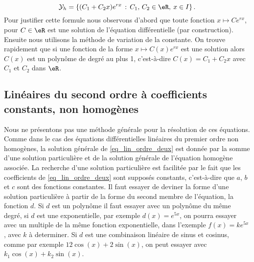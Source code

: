\begin{description}
\begin{equation}
		      \mathcal{Y}_h  = \left\{(C_1  +C_2x) e^{r x} \,:\, C_1,\, C_2 \in \eR, \: x\in I\right\}.
	      \end{equation}
	      Pour justifier cette formule nous observons d'abord que toute fonction \( x\mapsto Ce^{rx}\), pour \( C\in\eR\) est une solution de l'équation différentielle (par construction). Ensuite nous utilisons la méthode de variation de la constante. On trouve rapidement que si une fonction de la forme \( x\mapsto C(x)e^{rx}\) est une solution alors \( C(x)\) est un polynôme de degré au plus 1, c'est-à-dire \( C(x) = C_1 + C_2 x\) avec \( C_1\) et \( C_2\) dans \( \eR\).
\end{description}

\subsection{Linéaires du second ordre à coefficients constants, non homogènes}

Nous ne présentons pas une méthode générale pour la résolution de ces équations. Comme dans le cas des équations différentielles linéaires du premier ordre non homogènes, la solution générale de \eqref{eq_lin_ordre_deux} est donnée par la somme d'une solution particulière et de la solution générale de l'équation homogène associée. La recherche d'une solution particulière est facilitée par le fait que les coefficients de \eqref{eq_lin_ordre_deux} sont supposés constants, c'est-à-dire que \( a\), \( b\) et \( c\) sont des fonctions constantes. Il faut essayer de deviner la forme d'une solution particulière à partir de la forme du second membre de l'équation, la fonction \( d\). Si \( d\) est un polynôme il faut essayer avec un polynôme du même degré, si \( d\) est une exponentielle, par exemple \( d(x) = e^{5x}\), on pourra essayer avec un multiple de la m\^eme fonction exponentielle, dans l'exemple \( f(x) = k e^{5x}\), avec \( k\) à determiner. Si \( d\) est une combinaison linéaire de sinus et cosinus, comme par exemple \( 12\cos(x) + 2\sin(x)\), on peut essayer avec \( k_1\cos(x) + k_2\sin(x)\).

